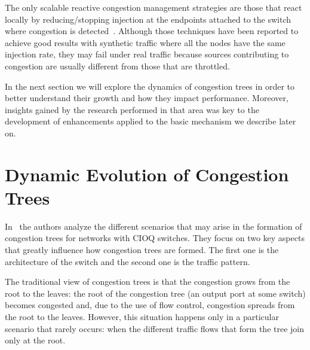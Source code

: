 The only scalable reactive congestion management strategies are those that react locally by reducing/stopping injection at the endpoints attached to the switch where congestion is detected~\cite{BLD01, LD93}. Although those techniques have been reported to achieve good results with synthetic traffic where all the nodes have the same injection rate, they may fail under real traffic because sources contributing to congestion are usually different from those that are throttled.

In the next section we will explore the dynamics of congestion trees in order to better understand their growth and how they impact performance. Moreover, insights gained by the research performed in that area was key to the development of enhancements applied to the basic mechanism we describe later on.

\section{Dynamic Evolution of Congestion Trees}\label{S:evolution}

In~\cite{paper1} the authors analyze the different scenarios that may arise in the formation of congestion trees for networks with CIOQ switches. They focus on two key aspects that greatly influence how congestion trees are formed. The first one is the architecture of the switch and the second one is the traffic pattern. 

The traditional view of congestion trees is that the congestion grows from the root to the leaves: the root of the congestion tree (an output port at some switch) becomes congested and, due to the use of flow control, congestion spreads from the root to the leaves. However, this situation happens only in a particular scenario that rarely occurs: when the different traffic flows that form the tree join only at the root.

